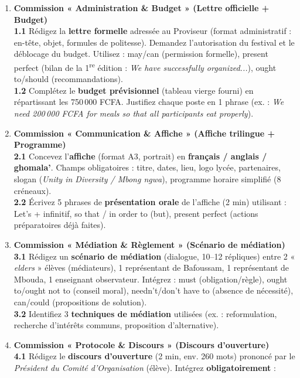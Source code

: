 \documentclass[11pt]{article}
\newcommand{\cle}[1]{{\popxbold\color{popdark}#1}}
\begin{document}
\begin{enumerate}
    \item \textbf{Commission « Administration \& Budget » (Lettre officielle + Budget)} \\
    \textbf{1.1} Rédigez la \textbf{lettre formelle} adressée au Proviseur (format administratif : en-tête, objet, formules de politesse). Demandez l'autorisation du festival et le déblocage du budget. Utilisez : \cle{may/can} (permission formelle), \cle{present perfect} (bilan de la 1\textsuperscript{re} édition : \emph{We have successfully organized...}), \cle{ought to/should} (recommandations). \\
    \textbf{1.2} Complétez le \textbf{budget prévisionnel} (tableau vierge fourni) en répartissant les 750\,000 FCFA. Justifiez chaque poste en 1 phrase (ex. : \emph{We need 200\,000 FCFA for meals so that all participants eat properly}).
    \item \textbf{Commission « Communication \& Affiche » (Affiche trilingue + Programme)} \\
    \textbf{2.1} Concevez l'\textbf{affiche} (format A3, portrait) en \textbf{français / anglais / ghomala'}. Champs obligatoires : titre, dates, lieu, logo lycée, partenaires, slogan (\emph{Unity in Diversity / Mbong ngwa}), programme horaire simplifié (8 créneaux). \\
    \textbf{2.2} Écrivez 5 phrases de \textbf{présentation orale} de l'affiche (2 min) utilisant : \cle{Let's} + infinitif, \cle{so that / in order to} (but), \cle{present perfect} (actions préparatoires déjà faites).
    \item \textbf{Commission « Médiation \& Règlement » (Scénario de médiation)} \\
    \textbf{3.1} Rédigez un \textbf{scénario de médiation} (dialogue, 10--12 répliques) entre 2 « \emph{elders} » élèves (médiateurs), 1 représentant de Bafoussam, 1 représentant de Mbouda, 1 enseignant observateur. Intégrez : \cle{must} (obligation/règle), \cle{ought to/ought not to} (conseil moral), \cle{needn't/don't have to} (absence de nécessité), \cle{can/could} (propositions de solution). \\
    \textbf{3.2} Identifiez 3 \textbf{techniques de médiation} utilisées (ex. : reformulation, recherche d'intérêts communs, proposition d'alternative).
    \item \textbf{Commission « Protocole \& Discours » (Discours d'ouverture)} \\
    \textbf{4.1} Rédigez le \textbf{discours d'ouverture} (2 min, env. 260 mots) prononcé par le \emph{Président du Comité d'Organisation} (élève). Intégrez \textbf{obligatoirement} : \\

\end{enumerate}
\end{document}
